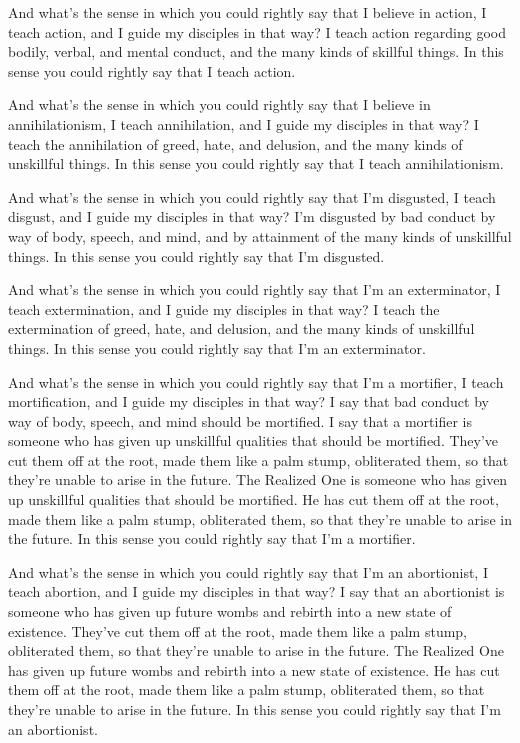\documentclass[12pt,openany]{book}%
\begin{document}
And what’s the sense in which you could rightly say that I believe in action, I teach action, and I guide my disciples in that way? I teach action regarding good bodily, verbal, and mental conduct, and the many kinds of skillful things. In this sense you could rightly say that I teach action. 

And what’s the sense in which you could rightly say that I believe in annihilationism, I teach annihilation, and I guide my disciples in that way? I teach the annihilation of greed, hate, and delusion, and the many kinds of unskillful things. In this sense you could rightly say that I teach annihilationism. 

And what’s the sense in which you could rightly say that I’m disgusted, I teach disgust, and I guide my disciples in that way? I’m disgusted by bad conduct by way of body, speech, and mind, and by attainment of the many kinds of unskillful things. In this sense you could rightly say that I’m disgusted. 

And what’s the sense in which you could rightly say that I'm an exterminator, I teach extermination, and I guide my disciples in that way? I teach the extermination of greed, hate, and delusion, and the many kinds of unskillful things. In this sense you could rightly say that I’m an exterminator. 

And what’s the sense in which you could rightly say that I’m a mortifier, I teach mortification, and I guide my disciples in that way? I say that bad conduct by way of body, speech, and mind should be mortified. I say that a mortifier is someone who has given up unskillful qualities that should be mortified. They’ve cut them off at the root, made them like a palm stump, obliterated them, so that they’re unable to arise in the future. The Realized One is someone who has given up unskillful qualities that should be mortified. He has cut them off at the root, made them like a palm stump, obliterated them, so that they’re unable to arise in the future. In this sense you could rightly say that I’m a mortifier. 

And what’s the sense in which you could rightly say that I’m an abortionist, I teach abortion, and I guide my disciples in that way? I say that an abortionist is someone who has given up future wombs and rebirth into a new state of existence. They’ve cut them off at the root, made them like a palm stump, obliterated them, so that they’re unable to arise in the future. The Realized One has given up future wombs and rebirth into a new state of existence. He has cut them off at the root, made them like a palm stump, obliterated them, so that they’re unable to arise in the future. In this sense you could rightly say that I’m an abortionist. 
\end{document}
